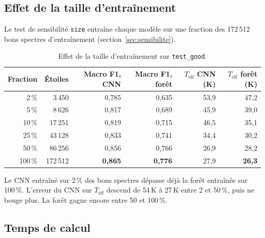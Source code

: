 \documentclass[11pt,a4paper]{article}
\newcommand{\teff}{$T_{\mathrm{eff}}$}
\begin{document}
\subsection{Effet de la taille d'entraînement}

Le test de sensibilité \texttt{size} entraîne chaque modèle sur une fraction des 172\,512 bons spectres d'entraînement (section~\ref{sec:sensibilite}).

\begin{table}[H]
\centering
\begin{tabular}{rrrrrr}
\toprule
Fraction & Étoiles & Macro F1, CNN & Macro F1, forêt & \teff{} CNN (K) & \teff{} forêt (K) \\
\midrule
2\,\% & 3\,450 & 0,785 & 0,635 & 53,9 & 47,2 \\
5\,\% & 8\,626 & 0,817 & 0,689 & 45,9 & 39,0 \\
10\,\% & 17\,251 & 0,819 & 0,715 & 46,5 & 35,1 \\
25\,\% & 43\,128 & 0,833 & 0,741 & 34,4 & 30,2 \\
50\,\% & 86\,256 & 0,856 & 0,766 & 26,9 & 28,2 \\
100\,\% & 172\,512 & \textbf{0,865} & \textbf{0,776} & 27,9 & \textbf{26,3} \\
\bottomrule
\end{tabular}
\caption{Effet de la taille d'entraînement sur \texttt{test\_good}.}
\label{tab:size}
\end{table}

Le CNN entraîné sur 2\,\% des bons spectres dépasse déjà la forêt entraînée sur 100\,\%. L'erreur du CNN sur \teff{} descend de 54\,K à 27\,K entre 2 et 50\,\%, puis ne bouge plus. La forêt gagne encore entre 50 et 100\,\%.

\subsection{Temps de calcul}
\end{document}
